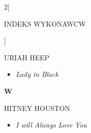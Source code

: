 \documentclass[a4paper]{report}
\begin{document}
\begin{multicols*}{2}[\begin{Huge}INDEKS WYKONAWCW\end{Huge}\vspace{1cm}]
\begin{minipage}{\columnwidth}
\begin{itemize}[topsep=3pt, after=\vspace{3mm}]
	\end{itemize}
\end{minipage}
\begin{minipage}{\columnwidth}
	URIAH HEEP 
	\begin{itemize}[topsep=3pt, after=\vspace{3mm}]
		\itemsep0em
		\item[]\textit{Lady in Black}  \\
	\end{itemize}
\end{minipage}
\begin{minipage}{\columnwidth}
	\begin{Large}\textbf{W}\end{Large}HITNEY HOUSTON 
	\begin{itemize}[topsep=3pt, after=\vspace{3mm}]
		\itemsep0em
		\item[]\textit{I will Always Love You}  \\
	\end{itemize}
\end{minipage}



\end{multicols*}
\end{document}
